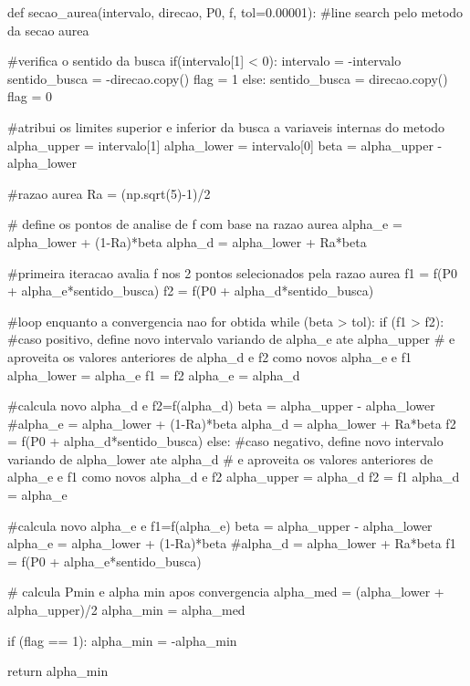 \documentclass[10pt, a4paper]{article}
\begin{document}
\begin{python}

def secao_aurea(intervalo, direcao, P0, f, tol=0.00001):
    #line search pelo metodo da secao aurea
    
    #verifica o sentido da busca
    if(intervalo[1] < 0):
        intervalo = -intervalo
        sentido_busca = -direcao.copy()
        flag = 1
    else:
        sentido_busca = direcao.copy()
        flag = 0
    
    #atribui os limites superior e inferior da busca a variaveis internas do metodo
    alpha_upper = intervalo[1]
    alpha_lower = intervalo[0]
    beta = alpha_upper - alpha_lower
    
    #razao aurea
    Ra = (np.sqrt(5)-1)/2
    
    # define os pontos de analise de f com base na razao aurea
    alpha_e = alpha_lower + (1-Ra)*beta
    alpha_d = alpha_lower + Ra*beta 
    
    #primeira iteracao avalia f nos 2 pontos selecionados pela razao aurea
    f1 = f(P0 + alpha_e*sentido_busca)
    f2 = f(P0 + alpha_d*sentido_busca)
    
    #loop enquanto a convergencia nao for obtida
    while (beta > tol):
        if (f1 > f2):
            #caso positivo, define novo intervalo variando de alpha_e ate alpha_upper
            # e aproveita os valores anteriores de alpha_d e f2 como novos alpha_e e f1
            alpha_lower = alpha_e
            f1 = f2
            alpha_e = alpha_d
            
            #calcula novo alpha_d e f2=f(alpha_d)
            beta = alpha_upper - alpha_lower
            #alpha_e = alpha_lower + (1-Ra)*beta
            alpha_d = alpha_lower + Ra*beta 
            f2 = f(P0 + alpha_d*sentido_busca)
        else:
            #caso negativo, define novo intervalo variando de alpha_lower ate alpha_d
            # e aproveita os valores anteriores de alpha_e e f1 como novos alpha_d e f2
            alpha_upper = alpha_d
            f2 = f1
            alpha_d = alpha_e
            
            #calcula novo alpha_e e f1=f(alpha_e)
            beta = alpha_upper - alpha_lower
            alpha_e = alpha_lower + (1-Ra)*beta
            #alpha_d = alpha_lower + Ra*beta 
            f1 = f(P0 + alpha_e*sentido_busca)
            
    # calcula Pmin e alpha min apos convergencia
    alpha_med = (alpha_lower + alpha_upper)/2
    alpha_min = alpha_med
    
    if (flag == 1):
        alpha_min = -alpha_min
    
    return alpha_min
\end{python}
\end{document}
